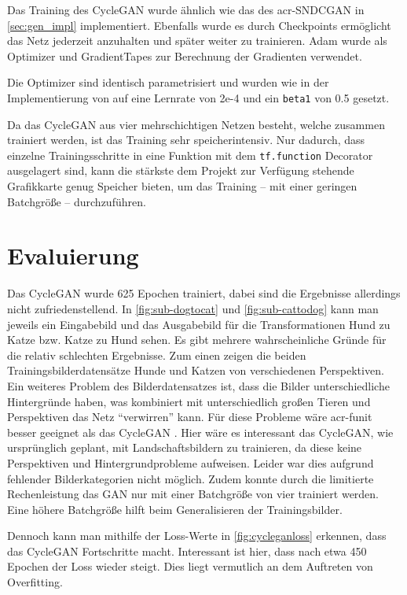  Das Training des CycleGAN wurde ähnlich wie das des \gls{acr-SNDCGAN} in \cref{sec:gen_impl} implementiert. Ebenfalls wurde es durch Checkpoints ermöglicht das Netz jederzeit anzuhalten und später weiter zu trainieren. Adam \cite{tf:adam} wurde als Optimizer und GradientTapes \cite{tf:gradientape} zur Berechnung der Gradienten verwendet.
 
Die Optimizer sind identisch parametrisiert und wurden wie in der Implementierung von \cite{brownlee_how_2019-1} auf eine Lernrate von 2e-4 und ein \texttt{beta1} von 0.5 gesetzt. 

Da das CycleGAN aus vier mehrschichtigen Netzen besteht, welche zusammen trainiert werden, ist das Training sehr speicherintensiv. Nur dadurch, dass einzelne Trainingsschritte in eine Funktion mit dem \texttt{tf.function} Decorator \cite{noauthor_tffunction_nodate} ausgelagert sind, kann die stärkste dem Projekt zur Verfügung stehende Grafikkarte genug Speicher bieten, um das Training – mit einer geringen Batchgröße – durchzuführen. 


 \section{Evaluierung} %
 
 Das CycleGAN wurde 625 Epochen trainiert, dabei sind die Ergebnisse allerdings nicht 
 zufriedenstellend. In \cref{fig:sub-dogtocat} und \ref{fig:sub-cattodog} kann man jeweils ein 
 Eingabebild und das Ausgabebild für die Transformationen Hund zu Katze bzw. Katze zu Hund 
 sehen. Es gibt mehrere wahrscheinliche Gründe für die relativ schlechten Ergebnisse. Zum einen 
 zeigen die beiden Trainingsbilderdatensätze Hunde und Katzen von verschiedenen Perspektiven. 
 Ein weiteres Problem des Bilderdatensatzes ist, dass die Bilder unterschiedliche Hintergründe 
 haben, was kombiniert mit unterschiedlich großen Tieren und Perspektiven das Netz 
 \enquote{verwirren} kann. Für diese Probleme wäre \gls{acr-funit} besser geeignet als das 
 CycleGAN 
 \cite{liu2019few}. Hier wäre es interessant das CycleGAN, wie ursprünglich geplant, mit
 Landschaftsbildern zu trainieren, da diese keine Perspektiven und Hintergrundprobleme aufweisen. 
 Leider war dies aufgrund fehlender Bilderkategorien nicht möglich. Zudem konnte durch die 
 limitierte Rechenleistung das GAN nur mit einer Batchgröße von vier trainiert werden. Eine höhere 
 Batchgröße hilft beim Generalisieren der Trainingsbilder. 
 
 Dennoch kann man mithilfe der Loss-Werte in \cref{fig:cycleganloss} erkennen, dass das CycleGAN 
 Fortschritte macht. Interessant ist hier, dass nach etwa 450 Epochen der Loss wieder steigt. Dies 
 liegt vermutlich an dem Auftreten von Overfitting. 


